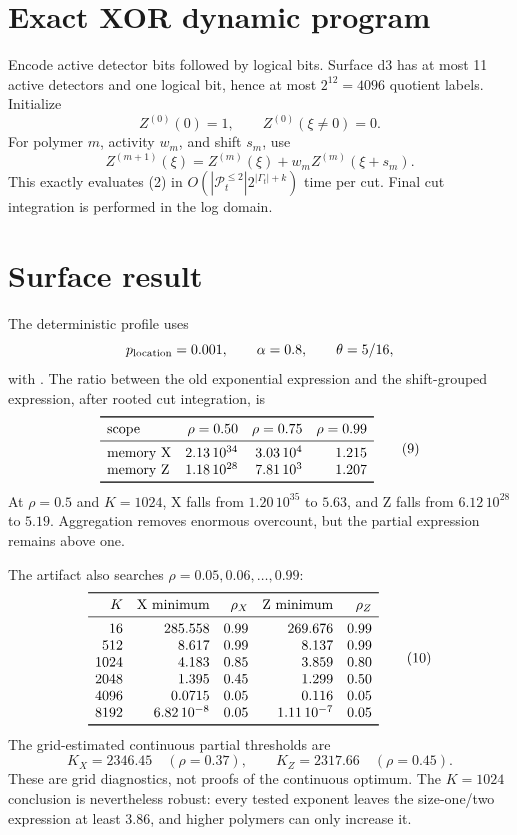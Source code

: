 \documentclass[11pt]{article}
\begin{document}
\section{Exact XOR dynamic program}

Encode active detector bits followed by logical bits.  Surface d3 has at
most 11 active detectors and one logical bit, hence at most \(2^{12}=4096\)
quotient labels.  Initialize
\[
 Z^{(0)}(0)=1,\qquad Z^{(0)}(\xi\ne0)=0.
\]
For polymer \(m\), activity \(w_m\), and shift \(s_m\), use
\[
\boxed{
 Z^{(m+1)}(\xi)
 =
 Z^{(m)}(\xi)+w_mZ^{(m)}(\xi+s_m).}
\tag{8}
\]
This exactly evaluates (2) in
\(O(|\mathcal P_t^{\le2}|2^{|\Gamma_t|+k})\) time per cut.  Final cut
integration is performed in the log domain.

\section{Surface result}

The deterministic profile uses
\[
 p_{\rm location}=0.001,\qquad
 \alpha=0.8,\qquad
 \theta=5/16,
\]
with \texttt{}.  The ratio between the old
exponential expression and the shift-grouped expression, after rooted cut
integration, is
\[
\begin{array}{lrrr}
\toprule
\text{scope}&\rho=0.50&\rho=0.75&\rho=0.99\\
\midrule
\text{memory X}&2.13\,10^{34}&3.03\,10^4&1.215\\
\text{memory Z}&1.18\,10^{28}&7.81\,10^3&1.207\\
\bottomrule
\end{array}
\tag{9}
\]
At \(\rho=0.5\) and \(K=1024\), X falls from
\(1.20\,10^{35}\) to \(5.63\), and Z falls from
\(6.12\,10^{28}\) to \(5.19\).  Aggregation removes enormous overcount,
but the partial expression remains above one.

The artifact also searches
\(\rho=0.05,0.06,\ldots,0.99\):
\[
\begin{array}{rrrrr}
\toprule
K&\text{X minimum}&\rho_X&\text{Z minimum}&\rho_Z\\
\midrule
16&285.558&0.99&269.676&0.99\\
512&8.617&0.99&8.137&0.99\\
1024&4.183&0.85&3.859&0.80\\
2048&1.395&0.45&1.299&0.50\\
4096&0.0715&0.05&0.116&0.05\\
8192&6.82\,10^{-8}&0.05&1.11\,10^{-7}&0.05\\
\bottomrule
\end{array}
\tag{10}
\]
The grid-estimated continuous partial thresholds are
\[
 K_X=2346.45\quad(\rho=0.37),
 \qquad
 K_Z=2317.66\quad(\rho=0.45).
\tag{11}
\]
These are grid diagnostics, not proofs of the continuous optimum.  The
\(K=1024\) conclusion is nevertheless robust: every tested exponent leaves
the size-one/two expression at least \(3.86\), and higher polymers can only
increase it.
\end{document}
